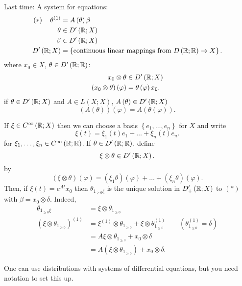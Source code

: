 
Last time: A system for equations:
\begin{align*}
	\left( *  \right) \quad	\theta ^{\left( 1 \right) } &=  A\left( \theta \right) \beta \\
	\theta &\in D'\left( \mathbb{R}; X \right)   \\
	\beta &\in D'\left( \mathbb{R}; X \right) \\
	D'\left( \mathbb{R}; X \right) &= \left\{ \text{continuous linear mappings from }D\left( \mathbb{R}; \mathbb{R} \right) \to X \right\} 
.\end{align*}
where $x_0 \in  X$, $\theta \in  D'\left( \mathbb{R}; \mathbb{R} \right) $:
\begin{align*}
	x_0 \otimes \theta &\in  D'\left( \mathbb{R}; X \right) \\
	\left( x_0 \otimes \theta  \right) \left( \varphi \right)  &= \theta \left( \varphi \right) x_0
.\end{align*}
if $\theta \in  D'\left( \mathbb{R}; X \right) $ and $A \in  L\left( X; X \right) $, $A\left( \theta  \right) \in  D'\left( \mathbb{R}; X \right) $ 
\[
	\left( A\left( \theta  \right)  \right) \left( \varphi \right)  = A\left( \theta \left( \varphi \right)  \right) 
.\] 

\begin{notation}
	If $\xi \in  C^{\infty}\left( \mathbb{R}; X \right) $ then we can choose a basis $\left\{ e_{1} , \ldots , e_{n} \right\} $ for $X$ and write 
	\[
		\xi\left( t \right)  = \xi_{1}\left( t \right) e_1 + \ldots + \xi_{n}\left( t \right) e_{n}
	.\] 
	for $\xi_{1} , \ldots , \xi_{n} \in  C^{\infty}\left( \mathbb{R}; \mathbb{R} \right) $. If $\theta \in  D'\left( \mathbb{R}; \mathbb{R} \right) $, define 
	\[
		\xi \otimes \theta \in  D'\left( \mathbb{R}; X \right) 
	.\] by
	\[
		\left( \xi \otimes \theta  \right) \left( \varphi \right)  = \left( \xi _{1} \theta  \right) \left( \varphi \right)  + \ldots + \left( \xi _{n}\theta  \right) \left( \varphi \right) 
	.\] 
	Then, if $\xi\left( t \right)  = e^{At}x_0$ then $\theta _{1 _{\ge 0}\xi}$ is the unique solution in $D'_{+}\left( \mathbb{R}; X \right) $ to $\left( * \right) $ with $\beta = x_0 \otimes \delta$. Indeed, 
	\begin{align*}
		\theta _{1_{\ge 0 }\xi} &= \xi \otimes \theta _{1 _{\ge 0}} \\
		\left( \xi \otimes \theta _{1 _{\ge  0}} \right) ^{\left( 1 \right) } &=  \xi ^{\left( 1 \right) } \otimes \theta _{1 _{\ge  0}} + \xi \otimes \theta _{1 _{\ge  0}}^{\left( 1 \right) } \quad\quad  \left(  \theta _{1 _{\ge  0}}^{\left( 1 \right) } = \delta\right) \\
		&= A\xi \otimes \theta _{1 _{\ge 0}} + x_0 \otimes \delta  \\
		&= A\left( \xi \otimes \theta _{1 _{\ge  0}} \right)  + x_0 \otimes \delta
	.\end{align*}
	\begin{punch}
	One can use distributions with systems of differential equations, but you need notation to set this up.
	\end{punch}
\end{notation}

